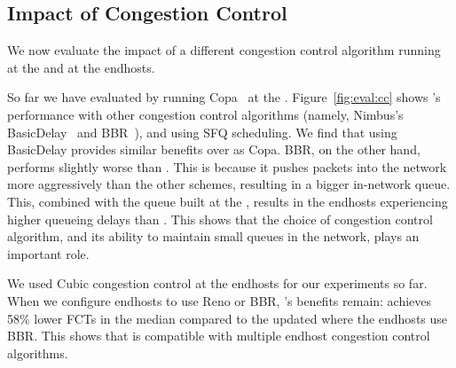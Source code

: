 \subsection{Impact of Congestion Control}\label{s:eval:cc}

We now evaluate the impact of a different congestion control algorithm running at the \inbox and at the endhosts.



 So far we have evaluated \name by running Copa~\cite{copa} at the \inbox. 
Figure~\ref{fig:eval:cc} shows \name's performance with other congestion control algorithms (namely, Nimbus's BasicDelay~\cite{nimbus-arxiv} and BBR~\cite{bbr}), and using SFQ scheduling. 
We find that using BasicDelay provides similar benefits over \baseline as Copa. 
BBR, on the other hand, performs slightly worse than \baseline. 
This is because it pushes packets into the network more aggressively than the other schemes, resulting in a bigger in-network queue.
This, combined with the queue built at the \name, results in the endhosts experiencing higher queueing delays than \baseline. This shows that the choice of congestion control algorithm, and its ability to maintain small queues in the network, plays an important role. 

 We used Cubic congestion control at the endhosts for our experiments so far. When we configure endhosts to use Reno or BBR, \name's benefits remain: \name achieves 58\% lower FCTs in the median compared to the updated \baseline where the endhosts use BBR. 
This shows that \name is compatible with multiple endhost congestion control algorithms.

